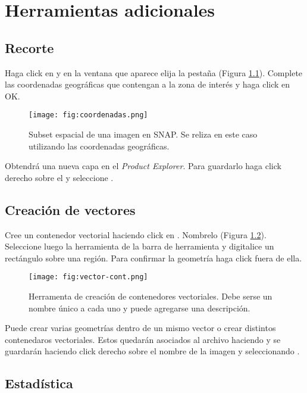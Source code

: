 \chapter{Herramientas adicionales}\label{ap:HA}

\section{Recorte}

Haga click en  y en la ventana que aparece elija la pestaña  (Figura \ref{fig:coordenadas}). Complete las coordenadas geográficas que contengan a la zona de interés y haga click en OK.

\begin{figure}[h!]
    \centering
    \texttt{[image: fig:coordenadas.png]}
    \caption{Subset espacial de una imagen en SNAP. Se reliza en este caso utilizando las coordenadas geográficas.}
    \label{fig:coordenadas}
\end{figure}

Obtendrá una nueva capa en el \emph{Product Explorer}. Para guardarlo haga click derecho sobre el y seleccione .

\section{Creación de vectores}

Cree un contenedor vectorial haciendo click en . Nombrelo  (Figura \ref{fig:vector-cont}). Seleccione luego la herramienta  de la barra de herramienta y digitalice un rectángulo sobre una región. Para confirmar la geometría haga click fuera de ella.

\begin{figure}[h!]
    \centering
    \texttt{[image: fig:vector-cont.png]}
    \caption{Herramenta de creación de contenedores vectoriales. Debe serse un nombre único a cada uno y puede agregarse una descripción.}
    \label{fig:vector-cont}
\end{figure}

Puede crear varias geometrías dentro de un mismo vector o crear distintos contenedaros vectoriales. Estos quedarán asociados al archivo haciendo y se guardarán haciendo click derecho sobre el nombre de la imagen y seleccionando .

\section{Estadística}

